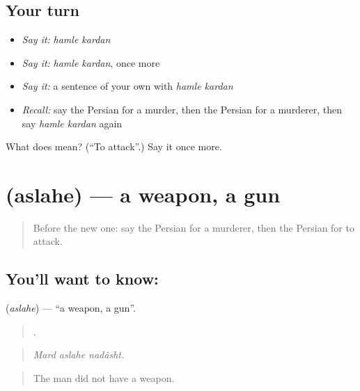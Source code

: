 \subsection*{Your turn}
\begin{itemize}
\raggedright
  \item \emph{Say it:} \emph{hamle kardan}
  \item \emph{Say it:} \emph{hamle kardan}, once more
  \item \emph{Say it:} a sentence of your own with \emph{hamle kardan}
  \item \emph{Recall:} say the Persian for a murder, then the Persian for a murderer, then say \emph{hamle kardan} again
\end{itemize}

\begin{tcolorbox}[breakable,colback=teal!4,colframe=teal!35!black,title={Before you move on}]
What does   mean? (\textquotedblleft{}To attack\textquotedblright{}.) Say it once more.
\end{tcolorbox}
\section[\texorpdfstring{\fa{اسلحه} (aslahe)}{اسلحه (aslahe)}]{ (aslahe) — a weapon, a gun}

\label{lesson:FA-C318-aslahe}



\begin{quote}
Before the new one: say the Persian for a murderer, then the Persian for to attack.
\end{quote}

\subsection*{You'll want to know: }
\textbf{} (\emph{aslahe}) — \textquotedblleft{}a weapon, a gun\textquotedblright{}.

\begin{quote}
  .
\end{quote}

\begin{quote}
\emph{Mard aslahe nadâsht.}
\end{quote}

\begin{quote}
The man did not have a weapon.
\end{quote}

